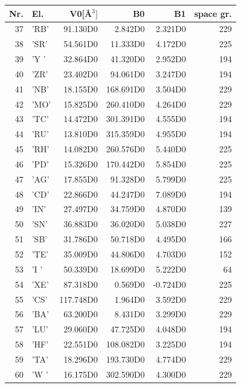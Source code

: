 \documentclass[11pt,a4paper]{report}
\begin{document}
\begin{table}[ht]
\begin{center}
\begin{tabular}{|r|l|r|r|r|r|}
\hline
Nr. & El. & V0[\AA$^3]$ & B0 & B1 & space gr.\\
\hline
 37 & 'RB'&    91.130D0&     2.842D0&     2.321D0&229 \\
 38 & 'SR'&    54.561D0&    11.333D0&     4.172D0&225 \\
 39 & 'Y '&    32.864D0&    41.320D0&     2.952D0&194 \\
 40 & 'ZR'&    23.402D0&    94.061D0&     3.247D0&194 \\
 41 & 'NB'&    18.155D0&   168.691D0&     3.504D0&229 \\
 42 & 'MO'&    15.825D0&   260.410D0&     4.264D0&229 \\
 43 & 'TC'&    14.472D0&   301.391D0&     4.555D0&194 \\
 44 & 'RU'&    13.810D0&   315.359D0&     4.955D0&194 \\
 45 & 'RH'&    14.082D0&   260.576D0&     5.440D0&225 \\
 46 & 'PD'&    15.326D0&   170.442D0&     5.854D0&225 \\
 47 & 'AG'&    17.855D0&    91.328D0&     5.799D0&225 \\
 48 & 'CD'&    22.866D0&    44.247D0&     7.089D0&194 \\
 49 & 'IN'&    27.497D0&    34.759D0&     4.870D0&139 \\
 50 & 'SN'&    36.883D0&    36.020D0&     5.038D0&227 \\
 51 & 'SB'&    31.786D0&    50.718D0&     4.495D0&166 \\
 52 & 'TE'&    35.009D0&    44.806D0&     4.703D0&152 \\
 53 & 'I '&    50.339D0&    18.699D0&     5.222D0& 64 \\
 54 & 'XE'&    87.318D0&     0.569D0&    -0.724D0&225 \\
 55 & 'CS'&   117.748D0&     1.964D0&     3.592D0&229 \\
 56 & 'BA'&    63.200D0&     8.431D0&     3.299D0&229 \\
 57 & 'LU'&    29.060D0&    47.725D0&     4.048D0&194 \\
 58 & 'HF'&    22.551D0&   108.082D0&     3.225D0&194 \\
 59 & 'TA'&    18.296D0&   193.730D0&     4.774D0&229 \\
 60 & 'W '&    16.175D0&   302.590D0&     4.300D0&229 \\

\end{tabular}
\end{center}
\end{table}
\end{document}
